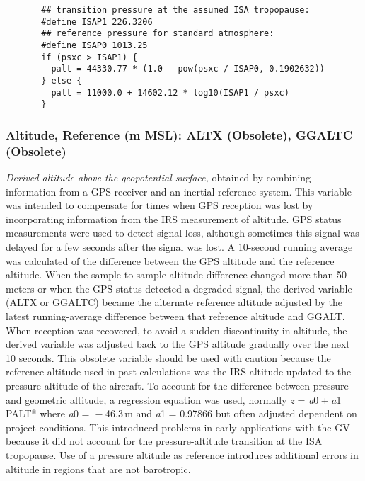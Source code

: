 \documentclass[
  english,
]{book}
\begin{document}
\begin{verbatim}
       ## transition pressure at the assumed ISA tropopause:
       #define ISAP1 226.3206
       ## reference pressure for standard atmosphere:
       #define ISAP0 1013.25
       if (psxc > ISAP1) {
         palt = 44330.77 * (1.0 - pow(psxc / ISAP0, 0.1902632))
       } else {
         palt = 11000.0 + 14602.12 * log10(ISAP1 / psxc)
       }
\end{verbatim}

\hypertarget{altx}{%
\subsubsection*{Altitude, Reference (m MSL): ALTX (Obsolete), GGALTC
(Obsolete)}\label{altx}}

\emph{Derived altitude above the geopotential surface,} obtained by
combining information from a GPS receiver and an inertial reference
system. This variable was intended to compensate for times when GPS
reception was lost by incorporating information from the IRS measurement
of altitude. GPS status measurements were used to detect signal loss,
although sometimes this signal was delayed for a few seconds after the
signal was lost. A 10-second running average was calculated of the
difference between the GPS altitude and the reference altitude. When the
sample-to-sample altitude difference changed more than 50 meters or when
the GPS status detected a degraded signal, the derived variable (ALTX or
GGALTC) became the alternate reference altitude adjusted by the latest
running-average difference between that reference altitude and GGALT.
When reception was recovered, to avoid a sudden discontinuity in
altitude, the derived variable was adjusted back to the GPS altitude
gradually over the next 10 seconds. This obsolete variable should be
used with caution because the reference altitude used in past
calculations was the IRS altitude updated to the pressure altitude of
the aircraft. To account for the difference between pressure and
geometric altitude, a regression equation was used, normally
\emph{z} = \emph{a}0 + \emph{a}1 \emph{ }PALT* where
{\emph{a}0 =  − 46.3} m and {\emph{a}1 = 0.97866} but often adjusted
dependent on project conditions. This introduced problems in early
applications with the GV because it did not account for the
pressure-altitude transition at the ISA tropopause. Use of a pressure
altitude as reference introduces additional errors in altitude in
regions that are not barotropic.
\end{document}
